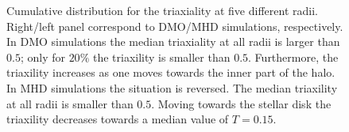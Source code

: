 \documentclass[a4paper,fleqn,usenatbib]{mnras}
\begin{document}
\begin{figure}
\caption{Cumulative distribution for the triaxiality at five different radii.
  Right/left panel correspond to DMO/MHD simulations, respectively. 
  In DMO simulations the median triaxiality at all radii is larger
  than $0.5$; only for $20\%$ the triaxility is smaller than $0.5$.
  Furthermore, the triaxility increases as one moves towards the inner
  part of the halo.
  In MHD simulations the situation is reversed.
  The median triaxility at all radii is smaller than $0.5$.
  Moving towards the stellar disk the triaxility decreases towards a median
  value of $T=0.15$.}
\label{fig:triaxial_cumulative}
\end{figure}
\end{document}
